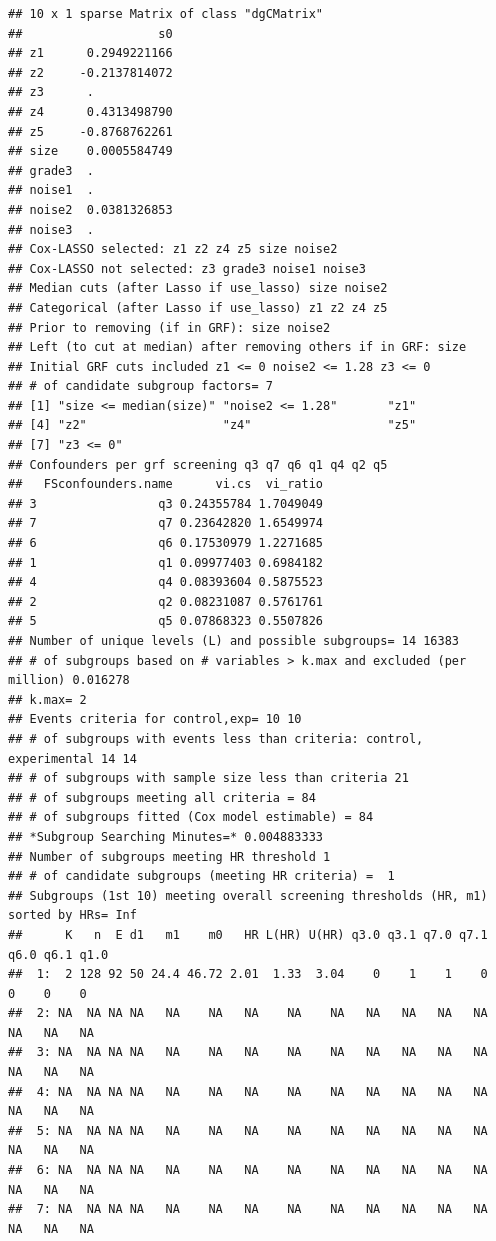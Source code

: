 \documentclass[smallextended]{svjour3}
\makeatletter
\newenvironment{kframe}{%
 \def\at@end@of@kframe{}%
 \ifinner\ifhmode%
  \def\at@end@of@kframe{\end{minipage}}%
  \begin{minipage}{\columnwidth}%
 \fi\fi%
 \def\FrameCommand##1{\hskip\@totalleftmargin \hskip-\fboxsep
 \colorbox{shadecolor}{##1}\hskip-\fboxsep
     \hskip-\linewidth \hskip-\@totalleftmargin \hskip\columnwidth}%
 \MakeFramed {\advance\hsize-\width
   \@totalleftmargin\z@ \linewidth\hsize
   \@setminipage}}%
 {\par\unskip\endMakeFramed%
 \at@end@of@kframe}
\newenvironment{knitrout}{}{} %
\makeatother
\begin{document}
\begin{knitrout}
\begin{kframe}
\begin{verbatim}
## 10 x 1 sparse Matrix of class "dgCMatrix"
##                   s0
## z1      0.2949221166
## z2     -0.2137814072
## z3      .           
## z4      0.4313498790
## z5     -0.8768762261
## size    0.0005584749
## grade3  .           
## noise1  .           
## noise2  0.0381326853
## noise3  .           
## Cox-LASSO selected: z1 z2 z4 z5 size noise2 
## Cox-LASSO not selected: z3 grade3 noise1 noise3 
## Median cuts (after Lasso if use_lasso) size noise2 
## Categorical (after Lasso if use_lasso) z1 z2 z4 z5 
## Prior to removing (if in GRF): size noise2 
## Left (to cut at median) after removing others if in GRF: size 
## Initial GRF cuts included z1 <= 0 noise2 <= 1.28 z3 <= 0 
## # of candidate subgroup factors= 7 
## [1] "size <= median(size)" "noise2 <= 1.28"       "z1"                  
## [4] "z2"                   "z4"                   "z5"                  
## [7] "z3 <= 0"             
## Confounders per grf screening q3 q7 q6 q1 q4 q2 q5 
##   FSconfounders.name      vi.cs  vi_ratio
## 3                 q3 0.24355784 1.7049049
## 7                 q7 0.23642820 1.6549974
## 6                 q6 0.17530979 1.2271685
## 1                 q1 0.09977403 0.6984182
## 4                 q4 0.08393604 0.5875523
## 2                 q2 0.08231087 0.5761761
## 5                 q5 0.07868323 0.5507826
## Number of unique levels (L) and possible subgroups= 14 16383 
## # of subgroups based on # variables > k.max and excluded (per million) 0.016278 
## k.max= 2 
## Events criteria for control,exp= 10 10 
## # of subgroups with events less than criteria: control, experimental 14 14 
## # of subgroups with sample size less than criteria 21 
## # of subgroups meeting all criteria = 84 
## # of subgroups fitted (Cox model estimable) = 84 
## *Subgroup Searching Minutes=* 0.004883333 
## Number of subgroups meeting HR threshold 1 
## # of candidate subgroups (meeting HR criteria) =  1 
## Subgroups (1st 10) meeting overall screening thresholds (HR, m1) sorted by HRs= Inf 
##      K   n  E d1   m1    m0   HR L(HR) U(HR) q3.0 q3.1 q7.0 q7.1 q6.0 q6.1 q1.0
##  1:  2 128 92 50 24.4 46.72 2.01  1.33  3.04    0    1    1    0    0    0    0
##  2: NA  NA NA NA   NA    NA   NA    NA    NA   NA   NA   NA   NA   NA   NA   NA
##  3: NA  NA NA NA   NA    NA   NA    NA    NA   NA   NA   NA   NA   NA   NA   NA
##  4: NA  NA NA NA   NA    NA   NA    NA    NA   NA   NA   NA   NA   NA   NA   NA
##  5: NA  NA NA NA   NA    NA   NA    NA    NA   NA   NA   NA   NA   NA   NA   NA
##  6: NA  NA NA NA   NA    NA   NA    NA    NA   NA   NA   NA   NA   NA   NA   NA
##  7: NA  NA NA NA   NA    NA   NA    NA    NA   NA   NA   NA   NA   NA   NA   NA

\end{verbatim}
\end{kframe}
\end{knitrout}
\end{document}
